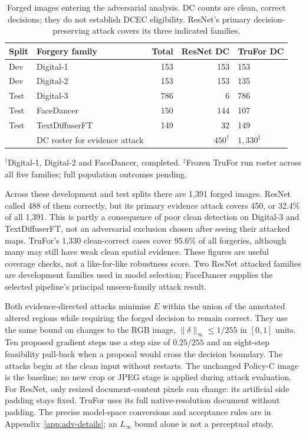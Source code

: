 \begin{table}[htbp]
\centering\small
\caption{Forged images entering the adversarial analysis. DC counts are clean, correct decisions; they do not establish DCEC eligibility. ResNet's primary decision-preserving attack covers its three indicated families.}
\label{tab:adv-populations}
\begin{tabular}{@{}llrrl@{}}
\toprule
Split & Forgery family & Total & ResNet DC & TruFor DC \\
\midrule
Dev & Digital-1 & 153 & 153 & 153 \\
Dev & Digital-2 & 153 & 153 & 135 \\
Test & Digital-3 & 786 & 6 & 786 \\
Test & FaceDancer & 150 & 144 & 107 \\
Test & TextDiffuserFT & 149 & 32 & 149 \\
\midrule
 & DC roster for evidence attack & & $450^{\dagger}$ & $1{,}330^{\ddagger}$ \\
\bottomrule
\end{tabular}

\vspace{2pt}\parbox{\linewidth}{\footnotesize $^{\dagger}$Digital-1, Digital-2 and FaceDancer, completed. $^{\ddagger}$Frozen TruFor run roster across all five families; full population outcomes pending.}
\end{table}

Across these development and test splits there are 1,391 forged images. ResNet called 488 of them correctly, but its primary evidence attack covers 450, or 32.4\% of all 1,391. This is partly a consequence of poor clean detection on Digital-3 and TextDiffuserFT, not an adversarial exclusion chosen after seeing their attacked maps. TruFor's 1,330 clean-correct cases cover 95.6\% of all forgeries, although many may still have weak clean spatial evidence. These figures are useful coverage checks, not a like-for-like robustness score. Two ResNet attacked families are development families used in model selection; FaceDancer supplies the selected pipeline's principal unseen-family attack result.

Both evidence-directed attacks minimise $E$ within the union of the annotated altered regions while requiring the forged decision to remain correct. They use the same bound on changes to the RGB image, $\lVert\delta\rVert_\infty\leq1/255$ in $[0,1]$ units. Ten proposed gradient steps use a step size of $0.25/255$ and an eight-step feasibility pull-back when a proposal would cross the decision boundary. The attacks begin at the clean input without restarts. The unchanged Policy-C image is the baseline; no new crop or JPEG stage is applied during attack evaluation. For ResNet, only resized document-content pixels can change: its artificial side padding stays fixed. TruFor uses its full native-resolution document without padding. The precise model-space conversions and acceptance rules are in Appendix~\ref{app:adv-details}; an $L_\infty$ bound alone is not a perceptual study.

